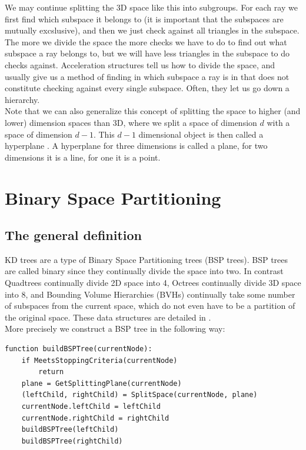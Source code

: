 \documentclass[12pt]{article}
\begin{document}
We may continue splitting the 3D space like this into subgroups. For each ray we first find which subspace it belongs to (it is important that the subspaces are mutually excslusive), and then we just check against all triangles in the subspace. The more we divide the space the more checks we have to do to find out what subspace a ray belongs to, but we will have less triangles in the subspace to do checks against. Acceleration structures tell us how to divide the space, and usually give us a method of finding in which subspace a ray is in that does not constitute checking against every single subspace. Often, they let us go down a hierarchy. \\
\indent Note that we can also generalize this concept of splitting the space to higher (and lower) dimension spaces than 3D, where we split a space of dimension $d$ with a space of dimension $d - 1$. This $d - 1$ dimensional object is then called a hyperplane \cite{rockafellar1970convex}. A hyperplane for three dimensions is called a plane, for two dimensions it is a line, for one it is a point.

\section{Binary Space Partitioning}
\subsection{The general definition}
KD trees are a type of Binary Space Partitioning trees (BSP trees). BSP trees are called binary since they continually divide the space into two. In contrast Quadtrees continually divide 2D space into 4, Octrees continually divide 3D space into 8, and Bounding Volume Hierarchies (BVHs) continually take some number of subspaces from the current space, which do not even have to be a partition of the original space. These data structures are detailed in \cite{ericson2004real}. \\
More precisely we construct a BSP tree in the following way:

\begin{lstlisting}
function buildBSPTree(currentNode):
	if MeetsStoppingCriteria(currentNode)
		return
	plane = GetSplittingPlane(currentNode)
	(leftChild, rightChild) = SplitSpace(currentNode, plane)
	currentNode.leftChild = leftChild
	currentNode.rightChild = rightChild
	buildBSPTree(leftChild)
	buildBSPTree(rightChild)
\end{lstlisting}
\end{document}
